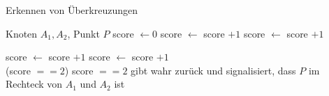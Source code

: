 \begin{algorithm}
    \caption{Erkennen von Überkreuzungen}
    \label{alg:check-point-in-rect}
    \begin{algorithmic}[1]
        \Require Knoten $A_1,A_2$, Punkt $P$
        \State score $\gets 0$
                \State score $\gets$ score $+ 1$
            \EndIf
        \Else
                \State score $\gets$ score $+ 1$
            \EndIf
        \EndIf

                \State score $\gets$ score $+ 1$
            \EndIf
        \Else
                \State score $\gets$ score $+ 1$
            \EndIf
        \EndIf\\
        \Return (score $== 2$)
        \Comment score $==2$ gibt wahr zurück und signalisiert, dass $P$ im Rechteck von $A_1$ und $A_2$ ist
    \end{algorithmic}
\end{algorithm}
